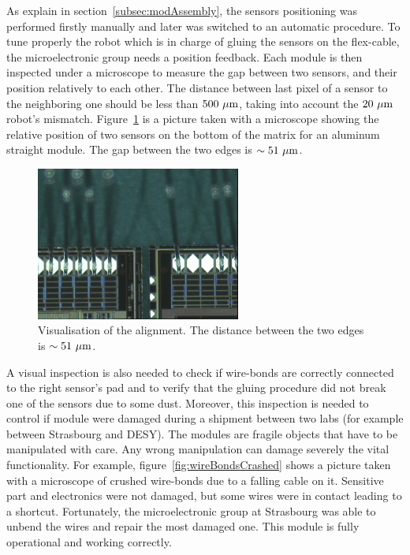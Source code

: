   As explain in section~\ref{subsec:modAssembly}, the sensors positioning was performed firstly manually and later was switched to an automatic procedure.
  To tune properly the robot which is in charge of gluing the sensors on the flex-cable, the microelectronic group needs a position feedback.
  Each module is then inspected under a microscope to measure the gap between two sensors, and their position relatively to each other.
  The distance between last pixel of a sensor to the neighboring one should be less than $500~\mu\rm{m}$, taking into account the $20~\mu\rm{m}$ robot's mismatch.
  Figure~\ref{fig:visAlign} is a picture taken with a microscope showing the relative position of two sensors on the bottom of the matrix for an aluminum straight module.
  The gap between the two edges is $\sim 51~\mu\rm{m}$. 
  
  \begin{figure}
    \centering
    \includegraphics[width=0.6\textwidth]{Pictures/labTests/alignment_sensors.jpg}
    \caption{Visualisation of the alignment. The distance between the two edges is $\sim 51~\mu\rm{m}$.}
    \label{fig:visAlign}
  \end{figure}
  
  A visual inspection is also needed to check if wire-bonds are correctly connected to the right sensor's pad and to verify that the gluing procedure did not break one of the sensors due to some dust.
  Moreover, this inspection is needed to control if module were damaged during a shipment between two labs (for example between Strasbourg and \gls{DESY}).
  The modules are fragile objects that have to be manipulated with care.
  Any wrong manipulation can damage severely the vital functionality.
  For example, figure~\ref{fig:wireBondsCrashed} shows a picture taken with a microscope of crushed wire-bonds due to a falling cable on it.
  Sensitive part and electronics were not damaged, but some wires were in contact leading to a shortcut.
  Fortunately, the microelectronic group at Strasbourg was able to unbend the wires and repair the most damaged one.
  This module is fully operational and working correctly.

